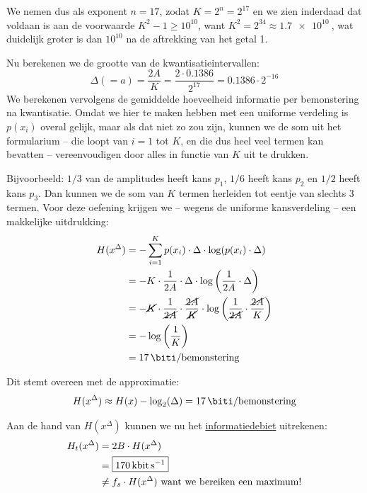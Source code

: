 \documentclass{kuburgiearticle}
\begin{document}
\begin{enumerate}
\begin{itemize}
			We nemen dus als exponent \(n=17\), zodat \( K=2^n=2^{17} \) en we zien inderdaad dat voldaan is aan de voorwaarde \( K^2-1\geq 10^{10} \), want \( K^2=2^{34} \approx \SI{1.7e10}{} \), wat duidelijk groter is dan \(10^{10}\) na de aftrekking van het getal 1.

			 Nu berekenen we de grootte van de kwantisatieintervallen: \[
			\Delta (=a) = \frac{2A}{K} = \dfrac{2\cdot 0.1386}{2^{17}} = 0.1386 \cdot 2^{-16}
			\]We berekenen vervolgens de gemiddelde hoeveelheid informatie per bemonstering na kwantisatie. Omdat we hier te maken hebben met een uniforme verdeling is \(p(x_i)\) overal gelijk, maar als dat niet zo zou zijn, kunnen we de som uit het formularium -- die loopt van \(i=1\) tot \(K\), en die dus heel veel termen kan bevatten -- vereenvoudigen door alles in functie van \(K\) uit te drukken.

			Bijvoorbeeld: \(1/3\) van de amplitudes heeft kans \(p_1\), \(1/6\) heeft kans \(p_2\) en \(1/2\) heeft kans \(p_3\). Dan kunnen we de som van \(K\) termen herleiden tot eentje van slechts \(3\) termen. Voor deze oefening krijgen we -- wegens de uniforme kansverdeling -- een makkelijke uitdrukking: \begin{align*}
				H(x^{\Delta}) &= - \sum_{i=1}^{K} p(x_i) \cdot \Delta \cdot \log(p(x_i)\cdot \Delta) \\
				&= - K \cdot \frac{1}{2A} \cdot \Delta \cdot \log\left(\frac{1}{2A} \cdot \Delta \right)\\
				& = - \cancel{K} \cdot \frac{1}{\cancel{2A}} \cdot \frac{\cancel{2A}}{\cancel{K}} \cdot \log\left(\frac{1}{\cancel{2A}} \cdot \frac{\cancel{2A}}{K} \right)\\
				&= -\log\left(\frac{1}{K}\right)\\
				&= \SI{17}{\biti \per bemonstering}
			\end{align*}

			Dit stemt overeen met de approximatie:
			\[
			H(x^{\Delta}) \approx H(x)-\log_2(\Delta) = \SI{17}{\biti \per bemonstering}
			\]

			Aan de hand van \( H(x^{\Delta}) \) kunnen we nu het \underline{informatiedebiet} uitrekenen: \begin{align*}
				H_{t}(x^{\Delta}) &= 2B \cdot H(x^{\Delta}) \\
				&= \boxed{\SI{170}{\kilo \bit \per \second}} \\
				&\neq f_s \cdot H(x^{\Delta}) \text{ want we bereiken een maximum!}
			\end{align*}


\end{itemize}
\end{enumerate}
\end{document}
